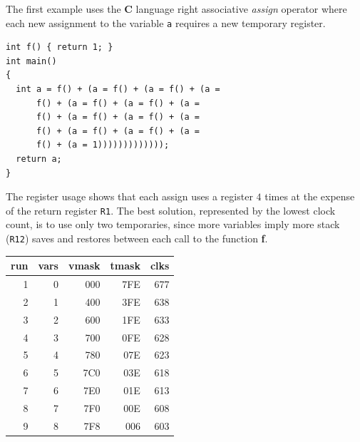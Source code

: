 \documentclass[journal]{IEEEtran}
\begin{document}
The first example uses the {\bf C} language right associative {\it assign} operator
where each new assignment to the variable {\tt a} requires a new temporary register.
{\small
\begin{verbatim}
int f() { return 1; }
int main()
{
  int a = f() + (a = f() + (a = f() + (a =
      f() + (a = f() + (a = f() + (a =
      f() + (a = f() + (a = f() + (a =
      f() + (a = f() + (a = f() + (a =
      f() + (a = 1)))))))))))));
  return a;
}
\end{verbatim}
}
The register usage shows that each assign uses a register $4$ times at
the expense of the return register {\tt R1}.
The best solution, represented by the lowest clock count,
is to use only two temporaries, since more variables imply more stack ({\tt R12})
saves and restores between each call to the function {\bf f}.
\begin{center}
{\small
\begin{tabular}{r|r|r|r|r}
run&vars&vmask&tmask&clks\\\hline
1&0&000&7FE&677\\
2&1&400&3FE&638\\
3&2&600&1FE&633\\
4&3&700&0FE&628\\
5&4&780&07E&623\\
6&5&7C0&03E&618\\
7&6&7E0&01E&613\\
8&7&7F0&00E&608\\
9&8&7F8&006&603\\
\end{tabular}
}
\end{center}
\end{document}
